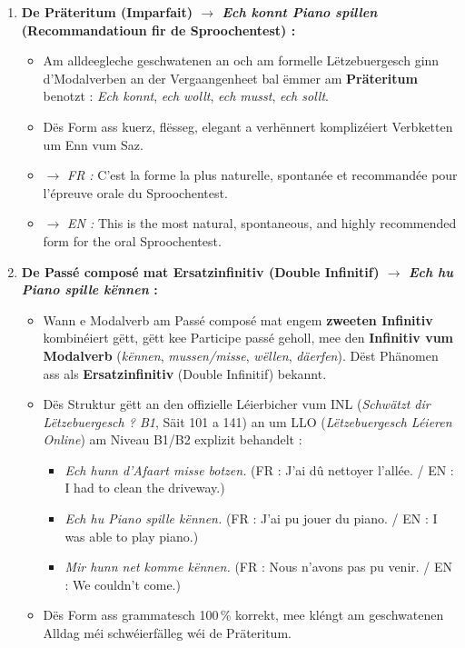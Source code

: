 \begin{enumerate}
    \item \textbf{De Präteritum (Imparfait) $\rightarrow$ \textit{Ech konnt Piano spillen} (Recommandatioun fir de Sproochentest) :}
    \begin{itemize}
        \item Am alldeegleche geschwatenen an och am formelle Lëtzebuergesch ginn d'Modalverben an der Vergaangenheet bal ëmmer am \textbf{Präteritum} benotzt : \textit{Ech konnt}, \textit{ech wollt}, \textit{ech musst}, \textit{ech sollt}.
        \item Dës Form ass kuerz, flësseg, elegant a verhënnert komplizéiert Verbketten um Enn vum Saz.
        \item $\rightarrow$ \textit{FR :} C'est la forme la plus naturelle, spontanée et recommandée pour l'épreuve orale du Sproochentest.
        \item $\rightarrow$ \textit{EN :} This is the most natural, spontaneous, and highly recommended form for the oral Sproochentest.
    \end{itemize}

    \vspace{0.3em}

    \item \textbf{De Passé composé mat Ersatzinfinitiv (Double Infinitif) $\rightarrow$ \textit{Ech hu Piano spille kënnen} :}
    \begin{itemize}
        \item Wann e Modalverb am Passé composé mat engem \textbf{zweeten Infinitiv} kombinéiert gëtt, gëtt kee Participe passé geholl, mee den \textbf{Infinitiv vum Modalverb} (\textit{kënnen}, \textit{mussen/misse}, \textit{wëllen}, \textit{däerfen}). Dëst Phänomen ass als \textbf{Ersatzinfinitiv} (Double Infinitif) bekannt.
        \item Dës Struktur gëtt an den offizielle Léierbicher vum INL (\textit{Schwätzt dir Lëtzebuergesch ? B1}, Säit 101 a 141) an um LLO (\textit{Lëtzebuergesch Léieren Online}) am Niveau B1/B2 explizit behandelt :
        \begin{itemize}
            \item \textit{Ech hunn d'Afaart misse botzen.} (FR : J'ai dû nettoyer l'allée. / EN : I had to clean the driveway.)
            \item \textit{Ech hu Piano spille kënnen.} (FR : J'ai pu jouer du piano. / EN : I was able to play piano.)
            \item \textit{Mir hunn net komme kënnen.} (FR : Nous n'avons pas pu venir. / EN : We couldn't come.)
        \end{itemize}
        \item Dës Form ass grammatesch 100\,\% korrekt, mee kléngt am geschwatenen Alldag méi schwéierfälleg wéi de Präteritum.
    \end{itemize}


\end{enumerate}
